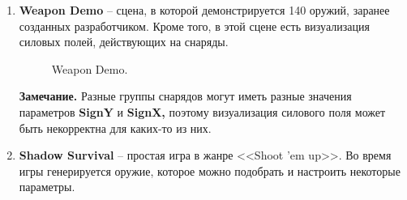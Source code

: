 \begin{enumerate}[label=\textbullet]
    \item \textbf{Weapon Demo} -- сцена, в которой демонстрируется 140 оружий, заранее созданных разработчиком. Кроме того, в этой сцене есть визуализация силовых полей, действующих на снаряды.

    \begin{figure}[ht]
        \begin{center}

            \caption{
                \label{WeaponDemo}
                Weapon Demo.}
        \end {center}
    \end {figure}

    \textbf{Замечание.} Разные группы снарядов могут иметь разные значения параметров {\small \textbf{SignY}} и {\small \textbf{SignX,}} поэтому визуализация силового поля может быть некорректна для каких-то из них.


    \item \textbf{Shadow Survival} -- простая игра в жанре <<Shoot ’em up>>. Во время игры генерируется оружие, которое можно подобрать и настроить некоторые параметры.

    \begin{figure}[ht]
        \begin{center}


\end{center}
\end{figure}
\end{enumerate}
